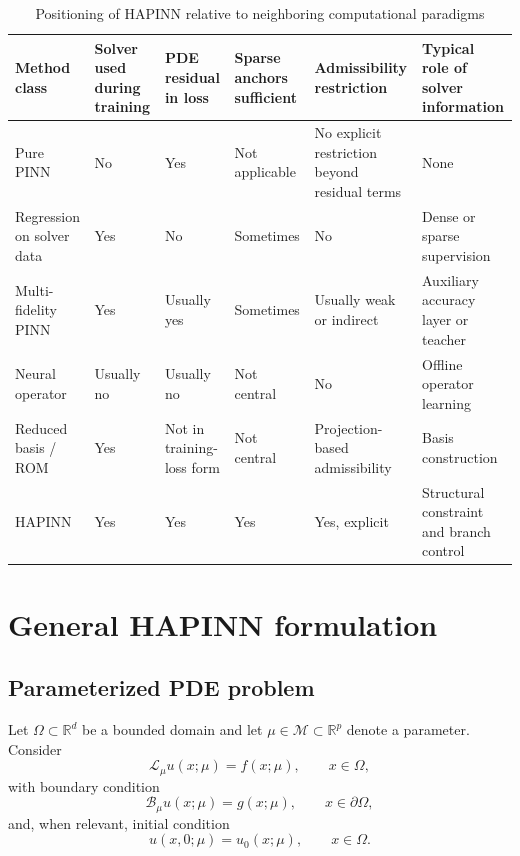 \documentclass[preprint,12pt]{elsarticle}
\theoremstyle{definition}
\numberwithin{equation}{section}
\newcommand{\R}{\mathbb{R}}
\newcommand{\cL}{\mathcal{L}}
\newcommand{\cB}{\mathcal{B}}
\newcommand{\cM}{\mathcal{M}}
\begin{document}
\begin{table}[H]
\centering
\caption{Positioning of HAPINN relative to neighboring computational paradigms}
\label{tab:positioning}
\renewcommand{\arraystretch}{1.25}
\begin{tabular}{p{2.9cm}p{2.6cm}p{2.4cm}p{2.3cm}p{2.2cm}p{2.4cm}}
\toprule
\textbf{Method class} & \textbf{Solver used during training} & \textbf{PDE residual in loss} & \textbf{Sparse anchors sufficient} & \textbf{Admissibility restriction} & \textbf{Typical role of solver information} \\
\midrule
Pure PINN & No & Yes & Not applicable & No explicit restriction beyond residual terms & None \\
\addlinespace
Regression on solver data & Yes & No & Sometimes & No & Dense or sparse supervision \\
\addlinespace
Multi-fidelity PINN & Yes & Usually yes & Sometimes & Usually weak or indirect & Auxiliary accuracy layer or teacher \\
\addlinespace
Neural operator & Usually no & Usually no & Not central & No & Offline operator learning \\
\addlinespace
Reduced basis / ROM & Yes & Not in training-loss form & Not central & Projection-based admissibility & Basis construction \\
\addlinespace
HAPINN & Yes & Yes & Yes & Yes, explicit & Structural constraint and branch control \\
\bottomrule
\end{tabular}
\end{table}

\section{General HAPINN formulation}
\label{sec:formulation}

\subsection{Parameterized PDE problem}

Let $\Omega\subset\R^d$ be a bounded domain and let $\mu\in\cM\subset\R^p$ denote a parameter. Consider
\begin{equation}
\cL_\mu u(x;\mu)=f(x;\mu),\qquad x\in\Omega,
\label{eq:pde_general}
\end{equation}
with boundary condition
\begin{equation}
\cB_\mu u(x;\mu)=g(x;\mu),\qquad x\in\partial\Omega,
\label{eq:bc_general}
\end{equation}
and, when relevant, initial condition
\begin{equation}
u(x,0;\mu)=u_0(x;\mu),\qquad x\in\Omega.
\label{eq:ic_general}
\end{equation}
\end{document}

